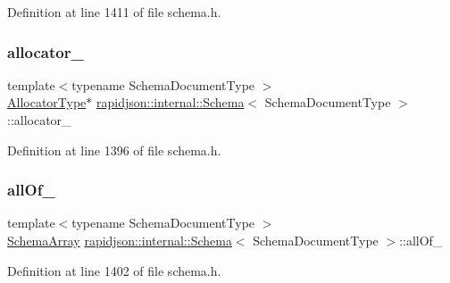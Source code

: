 Definition at line 1411 of file schema.\+h.

\mbox{\label{classrapidjson_1_1internal_1_1_schema_a08e3ca84f26f89ac1fdbc0f61356064e}} 
\subsubsection{\texorpdfstring{allocator\_}{allocator\_}}
{\footnotesize\ttfamily template$<$typename Schema\+Document\+Type $>$ \\
\mbox{\hyperlink{classrapidjson_1_1internal_1_1_schema_aaca940c164d906fdbf504f562bb2f956}{Allocator\+Type}}$\ast$ \mbox{\hyperlink{classrapidjson_1_1internal_1_1_schema}{rapidjson\+::internal\+::\+Schema}}$<$ Schema\+Document\+Type $>$\+::allocator\+\_\+\hspace{0.3cm}{\ttfamily [private]}}



Definition at line 1396 of file schema.\+h.

\mbox{\label{classrapidjson_1_1internal_1_1_schema_acdb65797f8099eee01c438f125ea4859}} 
\subsubsection{\texorpdfstring{allOf\_}{allOf\_}}
{\footnotesize\ttfamily template$<$typename Schema\+Document\+Type $>$ \\
\mbox{\hyperlink{structrapidjson_1_1internal_1_1_schema_1_1_schema_array}{Schema\+Array}} \mbox{\hyperlink{classrapidjson_1_1internal_1_1_schema}{rapidjson\+::internal\+::\+Schema}}$<$ Schema\+Document\+Type $>$\+::all\+Of\+\_\+\hspace{0.3cm}{\ttfamily [private]}}



Definition at line 1402 of file schema.\+h.


